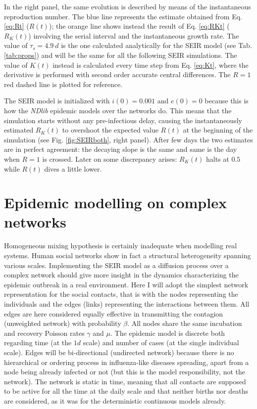 \documentclass[DIV=12, BCOR=0pt]{scrartcl}  %
\begin{document}
	In the right panel, the same evolution is described by means of the instantaneous reproduction number. The blue line represents the estimate obtained from Eq. \ref{eq:Rt} ($R(t)$); the orange line shows instead the result of Eq. \ref{eq:RKt} ($R_K(t)$) involving the serial interval and the instantaneous growth rate.  The value of $\tau_s = 4.9 \ d$ is the one calculated analytically for the SEIR model (see Tab. \ref{tab:props}) and will be the same for all the following SEIR simulations.
	The value of $K(t)$ instead is calculated every time step from Eq. \ref{eq:Kt}, where the derivative is performed with second order accurate central differences. The $R = 1$ red dashed line is plotted for reference.

	The SEIR model is initialized with $i(0) = 0.001$ and $e(0) = 0$ because this is how the \textit{NDlib} epidemic models over the networks do. This means that the simulation starts without any pre-infectious delay, causing the instantaneously estimated $R_K(t)$ to overshoot the expected value $R(t)$ at the beginning of the simulation (see Fig. \ref{fig:SEIRboth}, right panel). After few days the two estimates are in perfect agreement: the decaying slope is the same and same is the day when $R = 1$ is crossed. Later on some discrepancy arises: $R_K(t)$ halts at $0.5$ while $R(t)$ dives a little lower.
 
  

  
  \section{Epidemic modelling on complex networks}
  \label{sec:network}
  Homogeneous mixing hypothesis is certainly inadequate when modelling real systems. Human social networks show in fact a structural heterogeneity spanning various scales. Implementing the SEIR model as a diffusion process over a complex network should give more insight in the dynamics characterizing the epidemic outbreak in a real environment. Here I will adopt the simplest network representation for the social contacts, that is with the nodes representing the individuals and the edges (links) representing the interactions between them. All edges are here considered equally effective in transmitting the contagion (unweighted network) with probability $\beta$. All nodes share the same incubation and recovery Poisson rates $\gamma$ and $\mu$. 
  The epidemic model is discrete both regarding time (at the $1 d$ scale) and number of cases (at the single individual scale). Edges will be bi-directional (undirected network) because there is no hierarchical or ordering process in influenza-like diseases spreading, apart from a node being already infected or not (but this is the model responsibility, not the network). The network is static in time, meaning that all contacts are supposed to be active for all the time at the daily scale and that neither births nor deaths are considered, as it was for the deterministic continuous models already. 
  
\end{document}

